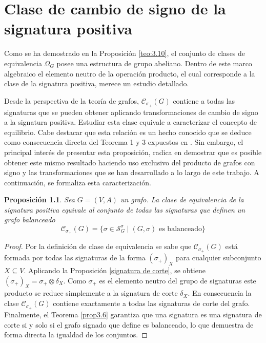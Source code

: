 \documentclass[11pt,a4paper,spanish]{report}
\theoremstyle{plain}
\newtheorem{proposicion}[teorema]{Proposición}
\begin{document}
\chapter{Clase de cambio de signo de la signatura positiva}\label{C6}
Como se ha demostrado en la Proposición \ref{teo:3.10}, el conjunto de clases de equivalencia $\Omega_G$ posee una estructura de grupo abeliano. Dentro de este marco algebraico el elemento neutro de la operación producto, el cual corresponde a la clase de la signatura positiva, merece un estudio detallado.

Desde la perspectiva de la teoría de grafos,  $\mathcal{C}_{\sigma_+}(G)$ contiene a todas las signaturas que se pueden obtener aplicando transformaciones de cambio de signo a la signatura positiva. Estudiar esta clase equivale a caracterizar el concepto de equilibrio. Cabe destacar que esta relación es un hecho conocido que se deduce como consecuencia directa del Teorema 1 y 3 expuestos en \cite{harary1953notion}. Sin embargo, el principal interés de presentar esta proposición, radica en demostrar que es posible obtener este mismo resultado haciendo uso exclusivo del producto de grafos con signo y las transformaciones que se han desarrollado a lo largo de este trabajo. A continuación, se formaliza esta caracterización.

\begin{proposicion} \label{prop:caracterizacion_clase_positiva}
Sea $G = (V, A)$ un grafo. La clase de equivalencia de la signatura positiva equivale al conjunto de todas las signaturas que definen un grafo balanceado
\[
\mathcal{C}_{\sigma_+}(G) = \{ \sigma \in \mathcal{S}_G^\sigma \mid (G, \sigma) \text{ es balanceado} \}
\]
\end{proposicion}

\begin{proof}
Por la definición de clase de equivalencia se sabe que $\mathcal{C}_{\sigma_+}(G)$ está formada por todas las signaturas de la forma $(\sigma_+)_X$ para cualquier subconjunto $X \subseteq V$. Aplicando la Proposición \ref{signatura de corte}, se obtiene $(\sigma_+)_X = \sigma_+ \otimes \delta_X$. Como $\sigma_+$ es el elemento neutro del grupo de signaturas este producto se reduce simplemente a la signatura de corte $\delta_X$. En consecuencia la clase $\mathcal{C}_{\sigma_+}(G)$ contiene exactamente a todas las signaturas de corte del grafo. Finalmente, el Teorema \ref{prop3.6} garantiza que una signatura es una signatura de corte si y solo si el grafo signado que define es balanceado, lo que demuestra de forma directa la igualdad de los conjuntos.
\end{proof}
\end{document}
